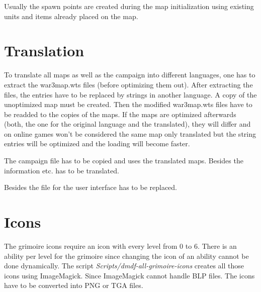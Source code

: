 \documentclass[a4paper,12pt,titlepage]{report}
\begin{document}
Usually the spawn points are created during the map initialization using existing units and items already placed on the map.

\newpage

\chapter{Translation}

To translate all maps as well as the campaign into different languages, one has to extract the war3map.wts files (before optimizing them out). After extracting the files, the entries have to be replaced by strings in another language. A copy of the unoptimized map must be created. Then the modified war3map.wts files have to be readded to the copies of the maps. If the maps are optimized afterwards (both, the one for the original language and the translated), they will differ and on online games won't be considered the same map only translated but the string entries will be optimized and the loading will become faster.

\vspace{\baselineskip}

The campaign file has to be copied and uses the translated maps. Besides the information etc. has to be translated.

\vspace{\baselineskip}

Besides the file for the user interface has to be replaced.

\newpage

\chapter{Icons}

The grimoire icons require an icon with every level from 0 to 6. There is an ability per level for the grimoire since changing the icon of an ability cannot be done dynamically. The script \emph{Scripts/dmdf-all-grimoire-icons} creates all those icons using ImageMagick. Since ImageMagick cannot handle BLP files. The icons have to be converted into PNG or TGA files.

\newpage

\cleardoublepage
{}
{}
\listoffigures

\newpage

%

\cleardoublepage
{}
{}
\renewcommand\lstlistingname{Listings}
\renewcommand\lstlistlistingname{Listings}
\lstlistoflistings

\newpage

\setcounter{biburlnumpenalty}{9000}
\setcounter{biburlucpenalty}{9000}
\setcounter{biburllcpenalty}{9000}
\cleardoublepage
{}
{}
\printbibliography[title=Bibliography]
\end{document}
